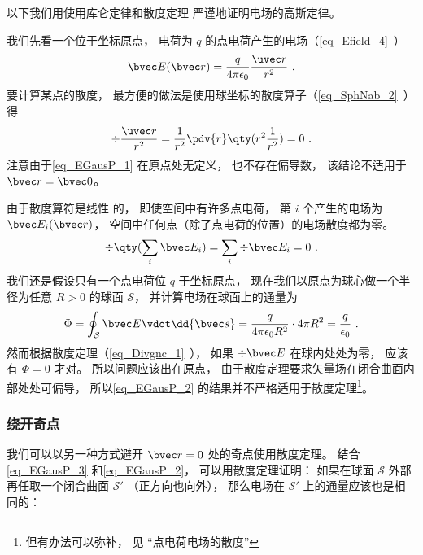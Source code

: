 

以下我们用使用库仑定律和散度定理 严谨地证明电场的高斯定律。

我们先看一个位于坐标原点， 电荷为 $q$ 的点电荷产生的电场（\autoref{eq_Efield_4}~）
\begin{equation}\label{eq_EGausP_1}
\bvec E(\bvec r) = \frac{q}{4\pi\epsilon_0}\frac{\uvec r}{r^2}~.
\end{equation}
要计算某点的散度， 最方便的做法是使用球坐标的散度算子（\autoref{eq_SphNab_2}~）得
\begin{equation}
\div \frac{\uvec r}{r^2} = \frac{1}{r^2} \pdv{r} \qty(r^2 \frac{1}{r^2}) = 0~.
\end{equation}
注意由于\autoref{eq_EGausP_1} 在原点处无定义， 也不存在偏导数， 该结论不适用于 $\bvec r = \bvec 0$。

由于散度算符是线性%
的， 即使空间中有许多点电荷， 第 $i$ 个产生的电场为 $\bvec E_i(\bvec r)$， 空间中任何点（除了点电荷的位置）的电场散度都为零。
\begin{equation}\label{eq_EGausP_3}
\div \qty(\sum_i \bvec E_i) = \sum_i \div \bvec E_i = 0~.
\end{equation}
我们还是假设只有一个点电荷位 $q$ 于坐标原点， 现在我们以原点为球心做一个半径为任意 $R > 0$ 的球面 $\mathcal S$， 并计算电场在球面上的通量为
\begin{equation}\label{eq_EGausP_2}
\Phi = \oint_{\mathcal S} \bvec E \vdot \dd{\bvec s} = \frac{q}{4\pi\epsilon_0 R^2} \cdot 4\pi R^2 = \frac{q}{\epsilon_0}~.
\end{equation}
然而根据散度定理（\autoref{eq_Divgnc_1}~）， 如果 $\div \bvec E$ 在球内处处为零， 应该有 $\Phi = 0$ 才对。 所以问题应该出在原点， 由于散度定理要求矢量场在闭合曲面内部处处可偏导， %
 所以\autoref{eq_EGausP_2} 的结果并不严格适用于散度定理\footnote{但有办法可以弥补， 见 “点电荷电场的散度”}。 %

\subsubsection{绕开奇点}
我们可以以另一种方式避开 $\bvec r = 0$ 处的奇点使用散度定理。 结合\autoref{eq_EGausP_3} 和\autoref{eq_EGausP_2}， 可以用散度定理证明： 如果在球面 $\mathcal S$ 外部再任取一个闭合曲面 $\mathcal S'$ （正方向也向外）， 那么电场在 $\mathcal S'$ 上的通量应该也是相同的：

